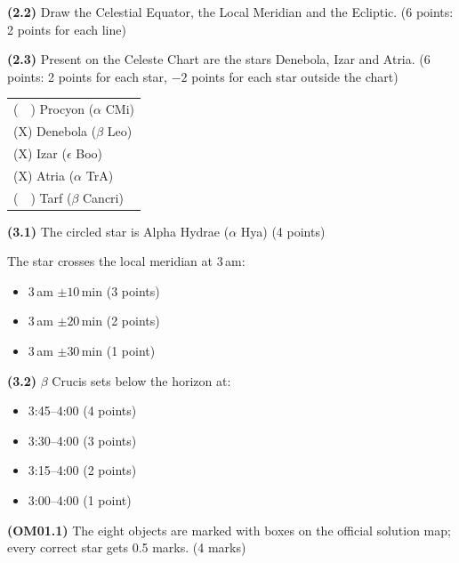 \textbf{(2.2)} Draw the Celestial Equator, the Local Meridian and the
Ecliptic. \hfill(6 points: 2 points for each line)


\textbf{(2.3)} Present on the Celeste Chart are the stars Denebola, Izar and
Atria. %
\hfill(6 points: 2 points for each star, $-2$ points for each star outside
the chart)

\begin{center}
\begin{tabular}{l}
(\ \ ) Procyon ($\alpha$ CMi) \\
(X) Denebola ($\beta$ Leo) \\
(X) Izar ($\epsilon$ Boo) \\
(X) Atria ($\alpha$ TrA) \\
(\ \ ) Tarf ($\beta$ Cancri) \\
\end{tabular}
\end{center}

\textbf{(3.1)} The circled star is Alpha Hydrae ($\alpha$ Hya)
\hfill(4 points)

The star crosses the local meridian at 3\,am:
\begin{itemize}
\item 3\,am $\pm 10$\,min \hfill(3 points)
\item 3\,am $\pm 20$\,min \hfill(2 points)
\item 3\,am $\pm 30$\,min \hfill(1 point)
\end{itemize}

\textbf{(3.2)} $\beta$ Crucis sets below the horizon at:
\begin{itemize}
\item 3:45--4:00 \hfill(4 points)
\item 3:30--4:00 \hfill(3 points)
\item 3:15--4:00 \hfill(2 points)
\item 3:00--4:00 \hfill(1 point)
\end{itemize}


\textbf{(OM01.1)} The eight objects are marked with boxes on the official
solution map; every correct star gets 0.5 marks. \hfill(4 marks)


